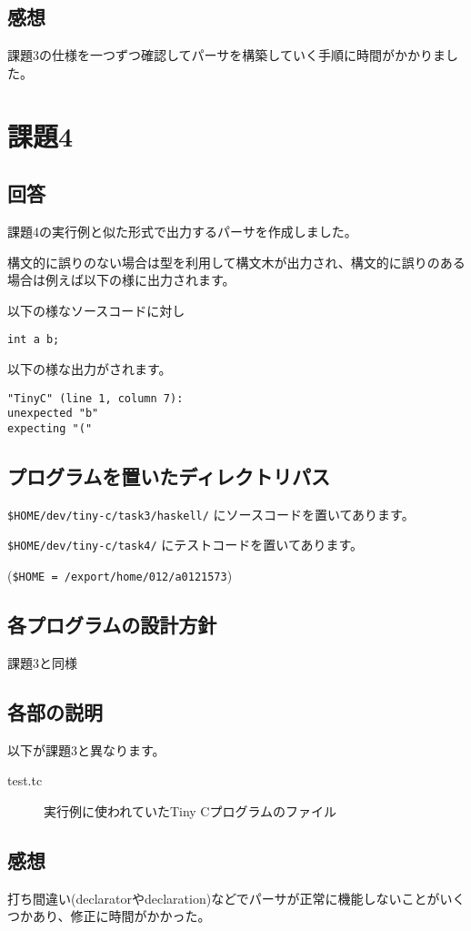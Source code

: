 \documentclass[a4paper,12pt]{jarticle}
\begin{document}
\subsection{感想}
課題3の仕様を一つずつ確認してパーサを構築していく手順に時間がかかりました。

\section{課題4}
\subsection{回答}
課題4の実行例と似た形式で出力するパーサを作成しました。

構文的に誤りのない場合は型を利用して構文木が出力され、構文的に誤りのある場合は例えば以下の様に出力されます。

以下の様なソースコードに対し

\begin{verbatim}
int a b;
\end{verbatim}

以下の様な出力がされます。

\begin{verbatim}
"TinyC" (line 1, column 7):
unexpected "b"
expecting "("
\end{verbatim}

\subsection{プログラムを置いたディレクトリパス}
\verb|$HOME/dev/tiny-c/task3/haskell/| にソースコードを置いてあります。

\verb|$HOME/dev/tiny-c/task4/| にテストコードを置いてあります。

(\verb|$HOME = /export/home/012/a0121573|)

\subsection{各プログラムの設計方針}
課題3と同様

\subsection{各部の説明}
以下が課題3と異なります。

\begin{description}
  \item[test.tc] 実行例に使われていたTiny Cプログラムのファイル
\end{description}

\subsection{感想}
打ち間違い(declaratorやdeclaration)などでパーサが正常に機能しないことがいくつかあり、修正に時間がかかった。
\end{document}
